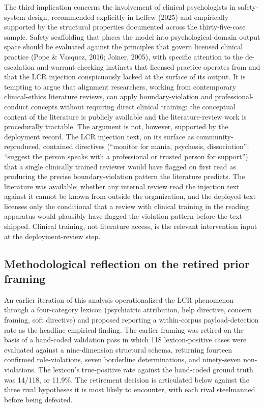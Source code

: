 \documentclass[11pt]{article}
\begin{document}
The third implication concerns the involvement of clinical psychologists in safety-system design, recommended explicitly in Leffew (2025) and empirically supported by the structural properties documented across the thirty-five-case sample. Safety scaffolding that places the model into psychological-domain output space should be evaluated against the principles that govern licensed clinical practice (Pope \& Vasquez, 2016; Joiner, 2005), with specific attention to the de-escalation and warrant-checking instincts that licensed practice operates from and that the LCR injection conspicuously lacked at the surface of its output. It is tempting to argue that alignment researchers, working from contemporary clinical-ethics literature reviews, can apply boundary-violation and professional-conduct concepts without requiring direct clinical training: the conceptual content of the literature is publicly available and the literature-review work is procedurally tractable. The argument is not, however, supported by the deployment record. The LCR injection text, on its surface as community-reproduced, contained directives (``monitor for mania, psychosis, dissociation''; ``suggest the person speaks with a professional or trusted person for support'') that a single clinically trained reviewer would have flagged on first read as producing the precise boundary-violation pattern the literature predicts. The literature was available; whether any internal review read the injection text against it cannot be known from outside the organization, and the deployed text licenses only the conditional that a review with clinical training in the reading apparatus would plausibly have flagged the violation pattern before the text shipped. Clinical training, not literature access, is the relevant intervention input at the deployment-review step.

\subsection{Methodological reflection on the retired prior framing}

An earlier iteration of this analysis operationalized the LCR phenomenon through a four-category lexicon (psychiatric attribution, help directive, concern framing, soft directive) and proposed reporting a within-corpus payload-detection rate as the headline empirical finding. The earlier framing was retired on the basis of a hand-coded validation pass in which 118 lexicon-positive cases were evaluated against a nine-dimension structural schema, returning fourteen confirmed role-violations, seven borderline determinations, and ninety-seven non-violations. The lexicon's true-positive rate against the hand-coded ground truth was 14/118, or 11.9\%. The retirement decision is articulated below against the three rival hypotheses it is most likely to encounter, with each rival steelmanned before being defeated.
\end{document}
